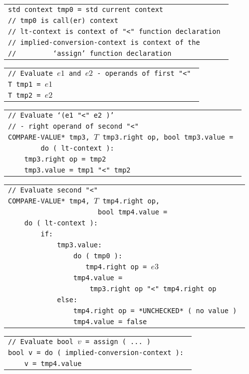 \documentclass[12pt]{article}
\newenvironment{indpar}[1][0.3in]%
	{\begin{list}{}%
		     {\setlength{\itemsep}{0in}%
		      \setlength{\topsep}{0in}%
		      \setlength{\parsep}{1ex}%
		      \setlength{\labelwidth}{#1}%
		      \setlength{\leftmargin}{#1}%
		      \addtolength{\leftmargin}{\labelsep}}%
	 \item}%
	{\end{list}}
\begin{document}
\begin{indpar}
\begin{tabular}{l}
\tt std context tmp0 = std current context \\
\tt // tmp0 is call(er) context \\
\tt // lt-context is context of "<" function declaration \\
\tt // implied-conversion-context is context of the \\
\tt // ~~~~~~~~`assign' function declaration \\
\end{tabular}

\begin{tabular}{l}
\tt // Evaluate $e1$ and $e2$ - operands of first "<" \\
\tt T tmp1 = $e1$ \\
\tt T tmp2 = $e2$ \\
\end{tabular}

\begin{tabular}{l}
\tt // Evaluate `($e1$ "<" $e2$ )' \\
\tt // - right operand of second "<" \\
\tt *COMPARE-VALUE* tmp3, $T$ tmp3.right op, bool tmp3.value = \\
\tt ~~~~~~~~do ( lt-context ): \\
\tt ~~~~tmp3.right op = tmp2 \\
\tt ~~~~tmp3.value = tmp1 "<" tmp2 \\
\end{tabular}

\begin{tabular}{l}
\tt // Evaluate second "<" \\
\tt *COMPARE-VALUE* tmp4, $T$ tmp4.right op,\\
\tt ~~~~~~~~~~~~~~~~~~~~~~bool tmp4.value = \\
\tt ~~~~do ( lt-context ): \\
\tt ~~~~~~~~if: \\
\tt ~~~~~~~~~~~~tmp3.value: \\
\tt ~~~~~~~~~~~~~~~~do ( tmp0 ): \\
\tt ~~~~~~~~~~~~~~~~~~~tmp4.right op = $e3$ \\
\tt ~~~~~~~~~~~~~~~~tmp4.value = \\
\tt ~~~~~~~~~~~~~~~~~~~~tmp3.right op "<" tmp4.right op \\
\tt ~~~~~~~~~~~~else: \\
\tt ~~~~~~~~~~~~~~~~tmp4.right op = *UNCHECKED* ( no value ) \\
\tt ~~~~~~~~~~~~~~~~tmp4.value = false \\
\end{tabular}

\begin{tabular}{l}
\tt // Evaluate bool $v$ = assign ( ... ) \\
\tt bool v = do ( implied-conversion-context ): \\
\tt ~~~~v = tmp4.value \\
\end{tabular}

\end{indpar}
\end{document}
